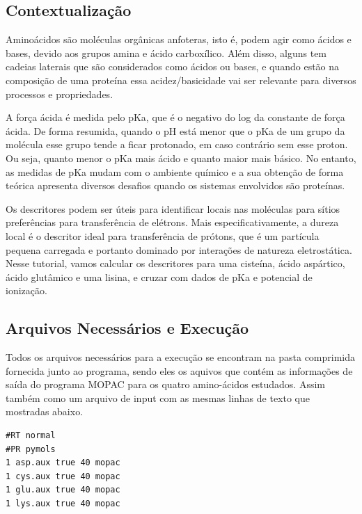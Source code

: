 \documentclass[a4paper,11pt]{refart}
\begin{document}
\subsection{Contextualização}

Aminoácidos são moléculas orgânicas anfoteras, isto é, podem agir como ácidos e bases, devido aos grupos amina e ácido carboxílico. Além disso, alguns tem cadeias laterais que são considerados como ácidos ou bases, e quando estão na composição de uma proteína essa acidez/basicidade vai ser relevante para diversos processos e propriedades.

A força ácida é medida pelo pKa, que é o negativo do log da constante de força ácida. De forma resumida, quando o pH está menor que o pKa de um grupo da molécula esse grupo tende a ficar protonado, em caso contrário sem esse proton. Ou seja, quanto menor o pKa mais ácido e quanto maior mais básico. No entanto, as medidas de pKa mudam com o ambiente químico e a sua obtenção de forma teórica apresenta diversos desafios quando os sistemas envolvidos são proteínas.

Os descritores podem ser úteis para identificar locais nas moléculas para sítios preferências para transferência de elétrons. Mais especificativamente, a dureza local é o descritor ideal para transferência de prótons, que é um partícula pequena carregada e portanto dominado por interações de natureza eletrostática. Nesse tutorial, vamos calcular os descritores para uma cisteína, ácido aspártico, ácido glutâmico e uma lisina, e cruzar com dados de pKa e potencial de ionização.


\subsection{Arquivos Necessários e Execução}

Todos os arquivos necessários para a execução se encontram na pasta comprimida fornecida junto ao programa, sendo eles os aquivos que contém as informações de saída do programa MOPAC para os quatro amino-ácidos estudados. Assim também como um arquivo de input com as mesmas linhas de texto que mostradas abaixo. 

\hspace*{-\leftmarginwidth}
\begin{minipage}{\fullwidth}
\begin{lstlisting}[caption={Input editado para execução do tutorial 3},label={tut402}]
#RT normal 
#PR pymols
1 asp.aux true 40 mopac
1 cys.aux true 40 mopac
1 glu.aux true 40 mopac
1 lys.aux true 40 mopac
\end{lstlisting}
\end{minipage}
\end{document}
